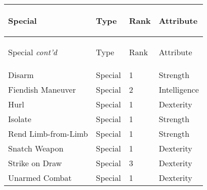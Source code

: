 \documentclass[twoside]{book}
\begin{document}
\begin{longtable}{p{1.25in}lll} 
  Special
  &
  \begin{turn}{70}{Type}\end{turn}
          
  &
  \begin{turn}{70}{Rank}\end{turn}
          
  &
  \begin{turn}{70}{Attribute}\end{turn}
          
  \\
  \hline
  \hline
  \endfirsthead
  Special \textit{cont'd}
        
  &
  \begin{turn}{70}{Type}\end{turn}
          
  &
  \begin{turn}{70}{Rank}\end{turn}
          
  &
  \begin{turn}{70}{Attribute}\end{turn}
          
  \\
  \hline
  \endhead
      
  \raggedright
           Disarm 
  &
   Special 
  &
   1 
  &
   Strength 
  \tabularnewline
      
  \raggedright
           Fiendish Maneuver 
  &
   Special 
  &
   2 
  &
   Intelligence 
  \tabularnewline
      
  \raggedright
           Hurl 
  &
   Special 
  &
   1 
  &
   Dexterity 
  \tabularnewline
      
  \raggedright
           Isolate 
  &
   Special 
  &
   1 
  &
   Strength 
  \tabularnewline
      
  \raggedright
           Rend Limb-from-Limb 
  &
   Special 
  &
   1 
  &
   Strength 
  \tabularnewline
      
  \raggedright
           Snatch Weapon 
  &
   Special 
  &
   1 
  &
   Dexterity 
  \tabularnewline
      
  \raggedright
           Strike on Draw 
  &
   Special 
  &
   3 
  &
   Dexterity 
  \tabularnewline
      
  \raggedright
           Unarmed Combat 
  &
   Special 
  &
   1 
  &
   Dexterity 
  \tabularnewline
      
\end{longtable}
    
\end{document}
